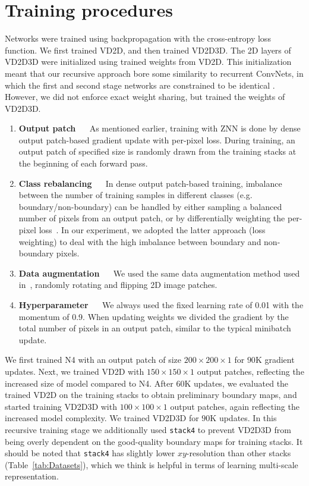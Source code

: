 \documentclass{article} %
\begin{document}
\section{Training procedures}
Networks were trained using backpropagation with the cross-entropy
loss function.  We first trained VD2D, and then trained VD2D3D.  The
2D layers of VD2D3D were initialized using trained weights from VD2D.
This initialization meant that our recursive approach bore some
similarity to recurrent ConvNets, in which the first and second stage
networks are constrained to be identical \cite{Pinheiro2014}.
However, we did not enforce exact weight sharing, but trained the
weights of VD2D3D.

\begin{enumerate}[]
\item{\bf Output patch} $\quad$
As mentioned earlier, training with ZNN is done by dense output patch-based gradient update with per-pixel loss. During training, an output patch of specified size is randomly drawn from the training stacks at the beginning of each forward pass.

\item{\bf Class rebalancing} $\quad$
In dense output patch-based training, imbalance between the number of training samples in different classes (e.g. boundary/non-boundary) can be handled by either sampling a balanced number of pixels from an output patch, or by differentially weighting the per-pixel loss~\cite{Long2015}. In our experiment, we adopted the latter approach (loss weighting) to deal with the high imbalance between boundary and non-boundary pixels.

\item{\bf Data augmentation} $\quad$
We used the same data augmentation method used in~\cite{Ciresan2012}, randomly rotating and flipping 2D image patches.

\item{\bf Hyperparameter} $\quad$
We always used the fixed learning rate of 0.01 with the momentum of 0.9. When updating weights we divided the gradient by the total number of pixels in an output patch, similar to the typical minibatch update.
\end{enumerate}

We first trained N4 with an output patch of size $200\times200\times1$ for $90$K gradient updates. Next, we trained VD2D with $150\times150\times1$ output patches, reflecting the increased size of model compared to N4. After $60$K updates, we evaluated the trained VD2D on the training stacks to obtain preliminary boundary maps, and started training VD2D3D with $100\times100\times1$ output patches, again reflecting the increased model complexity. We trained VD2D3D for $90$K updates. In this recursive training stage we additionally used \texttt{stack4} to prevent VD2D3D from being overly dependent on the good-quality boundary maps for training stacks. It should be noted that \texttt{stack4} has slightly lower $xy$-resolution than other stacks (Table~\ref{tab:Datasets}), which we think is helpful in terms of learning multi-scale representation.
\end{document}
